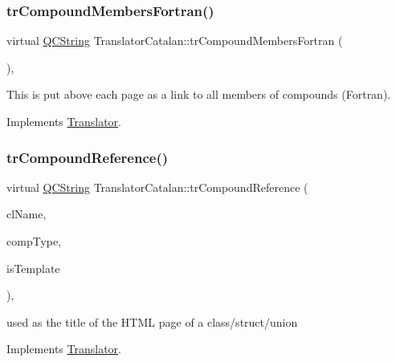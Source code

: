 \subsubsection{\texorpdfstring{trCompoundMembersFortran()}{trCompoundMembersFortran()}}
{\footnotesize\ttfamily virtual \mbox{\hyperlink{class_q_c_string}{Q\+C\+String}} Translator\+Catalan\+::tr\+Compound\+Members\+Fortran (\begin{DoxyParamCaption}{ }\end{DoxyParamCaption})\hspace{0.3cm}{\ttfamily [inline]}, {\ttfamily [virtual]}}

This is put above each page as a link to all members of compounds (Fortran). 

Implements \mbox{\hyperlink{class_translator}{Translator}}.

\mbox{\label{class_translator_catalan_ae50a7c61b82474484abb506506df0d99}} 
\subsubsection{\texorpdfstring{trCompoundReference()}{trCompoundReference()}}
{\footnotesize\ttfamily virtual \mbox{\hyperlink{class_q_c_string}{Q\+C\+String}} Translator\+Catalan\+::tr\+Compound\+Reference (\begin{DoxyParamCaption}\item[{const char $\ast$}]{cl\+Name,  }\item[{\mbox{\hyperlink{class_class_def_ae70cf86d35fe954a94c566fbcfc87939}{Class\+Def\+::\+Compound\+Type}}}]{comp\+Type,  }\item[{bool}]{is\+Template }\end{DoxyParamCaption})\hspace{0.3cm}{\ttfamily [inline]}, {\ttfamily [virtual]}}

used as the title of the H\+T\+ML page of a class/struct/union 

Implements \mbox{\hyperlink{class_translator}{Translator}}.

\mbox{\label{class_translator_catalan_aa059471d2223dd0e4b573b12ef6c2632}} 

